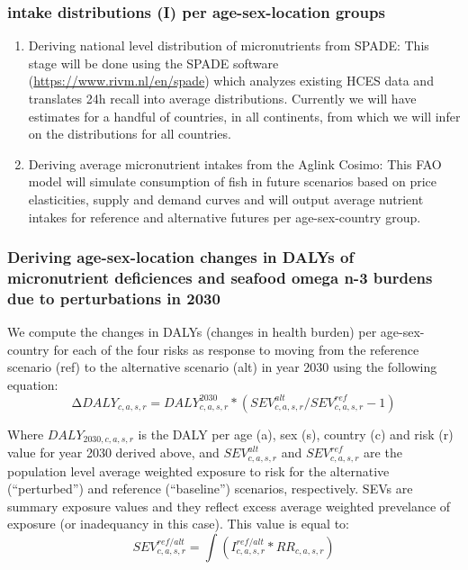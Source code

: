 \documentclass[
]{article}
\begin{document}
\hypertarget{intake-distributions-i-per-age-sex-location-groups}{%
\subsubsection{intake distributions (I) per age-sex-location
groups}\label{intake-distributions-i-per-age-sex-location-groups}}

\begin{enumerate}
\def\labelenumi{\arabic{enumi}.}
\item
  Deriving national level distribution of micronutrients from SPADE:
  This stage will be done using the SPADE software
  (\url{https://www.rivm.nl/en/spade}) which analyzes existing HCES data
  and translates 24h recall into average distributions. Currently we
  will have estimates for a handful of countries, in all continents,
  from which we will infer on the distributions for all countries.
\item
  Deriving average micronutrient intakes from the Aglink Cosimo: This
  FAO model will simulate consumption of fish in future scenarios based
  on price elasticities, supply and demand curves and will output
  average nutrient intakes for reference and alternative futures per
  age-sex-country group.
\end{enumerate}

\hypertarget{deriving-age-sex-location-changes-in-dalys-of-micronutrient-deficiences-and-seafood-omega-n-3-burdens-due-to-perturbations-in-2030}{%
\subsubsection{Deriving age-sex-location changes in DALYs of
micronutrient deficiences and seafood omega n-3 burdens due to
perturbations in
2030}\label{deriving-age-sex-location-changes-in-dalys-of-micronutrient-deficiences-and-seafood-omega-n-3-burdens-due-to-perturbations-in-2030}}

We compute the changes in DALYs (changes in health burden) per
age-sex-country for each of the four risks as response to moving from
the reference scenario (ref) to the alternative scenario (alt) in year
2030 using the following equation: \[
                                    ∆DALY_{c,a,s,r}=DALY^{2030}_{c,a,s,r}*(SEV^{alt}_{c,a,s,r}/SEV^{ref}_{c,a,s,r}-1)
                                    \]

Where \(DALY_{2030,c,a,s,r}\) is the DALY per age (a), sex (s), country
(c) and risk (r) value for year 2030 derived above, and
\(SEV^{alt}_{c,a,s,r}\) and \(SEV^{ref}_{c,a,s,r}\) are the population
level average weighted exposure to risk for the alternative
(``perturbed'') and reference (``baseline'') scenarios, respectively.
SEVs are summary exposure values and they reflect excess average
weighted prevelance of exposure (or inadequancy in this case). This
value is equal to: \[
                         SEV^{ref/alt}_{c,a,s,r} = \int(I^{ref/alt}_{c,a,s,r}*RR_{c,a,s,r})\]
\end{document}
